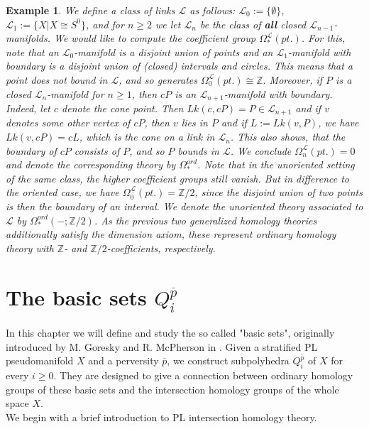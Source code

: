 \documentclass{scrreprt}
\newtheorem{example}[prop]{Example}
\begin{document}
\begin{example}
We define a class of links $\mathcal{L}$ as follows: $\mathcal{L}_0 := \{ \emptyset \}$, $\mathcal{L}_1 := \{ X|X \cong S^0 \}$, and for $n \geq 2$ we let $\mathcal{L}_n$ be the class of \textbf{all} closed $\mathcal{L}_{n-1}$-manifolds. We would like to compute the coefficient group $\Omega_*^{\mathcal{L}}(pt.)$. For this, note that an $\mathcal{L}_0$-manifold is a disjoint union of points and an $\mathcal{L}_1$-manifold with boundary is a disjoint union of (closed) intervals and circles. This means that a point does not bound in $\mathcal{L}$, and so generates 
$\Omega_0^{\mathcal{L}}(pt.) \cong \mathbb{Z}.$ Moreover, if $P$ is a closed $\mathcal{L}_n$-manifold for $n \geq 1$, then $cP$ is an $\mathcal{L}_{n+1}$-manifold with boundary. Indeed, let $c$ denote the cone point. Then $Lk(c,cP)=P \in \mathcal{L}_{n+1}$ and if $v$ denotes some other vertex of $cP$, then $v$ lies in $P$ and if $L:=Lk(v,P)$, we have $Lk(v,cP)=cL$, which is the cone on a link in $\mathcal{L}_n$. This also shows, that the boundary of $cP$ consists of $P$, and so $P$ bounds in $\mathcal{L}$. We conclude $\Omega_n^{\mathcal{L}}(pt.)=0$ and denote the corresponding theory by $\Omega_*^{ord}$. Note that in the unoriented setting of the same class, the higher coefficient groups still vanish. But in difference to the oriented case, we have $\Omega_0^{\underline{\mathcal{L}}}(pt.)= \mathbb{Z}/2$, since the disjoint union of two points is then the boundary of an interval. We denote the unoriented theory associated to $\mathcal{L}$ by $\Omega_*^{ord}(-; \mathbb{Z}/2)$. As the previous two generalized homology theories additionally satisfy the dimension axiom, these represent ordinary homology theory with $\mathbb{Z}$- and $\mathbb{Z}/2$-coefficients, respectively.
\end{example}

\chapter{The basic sets $Q_i^{\overline{p}}$}
In this chapter we will define and study the so called "basic sets", originally introduced by M. Goresky and R. McPherson in \cite{GM}. Given a stratified PL pseudomanifold $X$ and a perversity $\overline{p}$, we construct subpolyhedra $Q_i^{\overline{p}}$ of $X$ for every $i \geq 0$. They are designed to give a connection between ordinary homology groups of these basic sets and the intersection homology groups of the whole space $X$. \\
We begin with a brief introduction to PL intersection homology theory.
\end{document}

